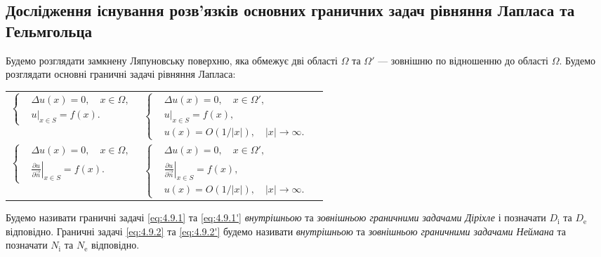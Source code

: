 \subsection{Дослідження існування розв'язків основних граничних задач рівняння Лапласа та Гельмгольца}

Будемо розглядати замкнену Ляпуновську поверхню, яка обмежує дві області $\Omega$ та $\Omega'$ --- зовнішню по відношенню до області $\Omega$. Будемо розглядати основні граничні задачі рівняння Лапласа:
\begin{longtable}{p{} p{} p{}}
	\parbox{.45\textwidth}{\begin{equation}\label{eq:4.9.1}\left\{\begin{aligned}
		& \Delta u(x) = 0, \quad x \in \Omega, \\
		& \left. u \right|_{x \in S} = f(x).
	\end{aligned}\right.\end{equation}} & \parbox{.45\textwidth}{\begin{equation}\label{eq:4.9.1'}\left\{\begin{aligned}
		& \Delta u(x) = 0, \quad x \in \Omega', \\
		& \left. u \right|_{x \in S} = f(x), \\
		& u(x) = O(1/|x|), \quad |x| \to \infty.
	\end{aligned}\right.\end{equation}} \\
	\parbox{.45\textwidth}{\begin{equation}\label{eq:4.9.2}\left\{\begin{aligned}
		& \Delta u(x) = 0, \quad x \in \Omega, \\
		& \left. \frac{\partial u}{\partial \vec n} \right|_{x \in S} = f(x).
	\end{aligned}\right.\end{equation}} & \parbox{.45\textwidth}{\begin{equation}\label{eq:4.9.2'}\left\{\begin{aligned}
		& \Delta u(x) = 0, \quad x \in \Omega', \\
		& \left. \frac{\partial u}{\partial \vec n} \right|_{x \in S} = f(x), \\
		& u(x) = O(1/|x|), \quad |x| \to \infty.
	\end{aligned}\right.\end{equation}}
\end{longtable}

\begin{definition}
	Будемо називати граничні задачі \eqref{eq:4.9.1} та \eqref{eq:4.9.1'} \textit{внутрішньою} та \textit{зовнішньою граничними задачами Діріхле} і позначати $D_{\text{i}}$ та $D_{\text{e}}$ відповідно. Граничні задачі \eqref{eq:4.9.2} та \eqref{eq:4.9.2'} будемо називати \textit{внутрішньою} та \textit{зовнішньою граничними задачами Неймана} та позначати $N_{\text{i}}$ та $N_{\text{e}}$ відповідно.  	
\end{definition}

